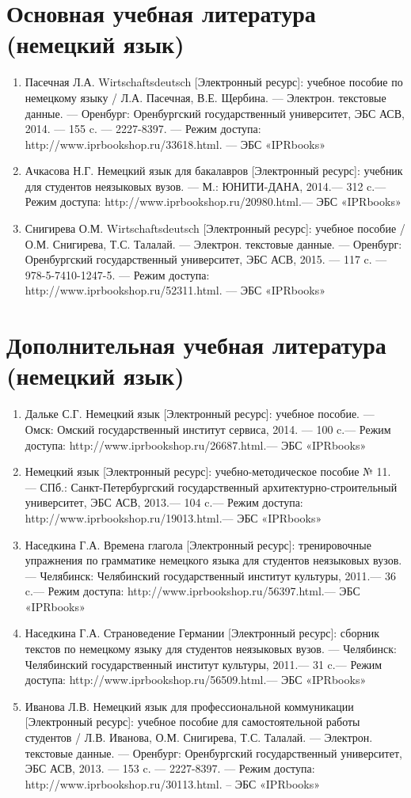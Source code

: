 \section{Основная учебная литература (немецкий язык)}
\begin{enumerate}
\item Пасечная Л.А. Wirtschaftsdeutsch [Электронный ресурс]: учебное пособие по немецкому языку / Л.А. Пасечная, В.Е. Щербина. — Электрон. текстовые данные. — Оренбург: Оренбургский государственный университет, ЭБС АСВ, 2014. — 155 c. — 2227-8397. — Режим доступа: http://www.iprbookshop.ru/33618.html. — ЭБС «IPRbooks»
\item Ачкасова Н.Г. Немецкий язык для бакалавров [Электронный ресурс]: учебник для студентов неязыковых вузов. — М.: ЮНИТИ-ДАНА, 2014.— 312 c.— Режим доступа: http://www.iprbookshop.ru/20980.html.— ЭБС «IPRbooks»
\item Снигирева О.М. Wirtschaftsdeutsch [Электронный ресурс]: учебное пособие / О.М. Снигирева, Т.С. Талалай. — Электрон. текстовые данные. — Оренбург: Оренбургский государственный университет, ЭБС АСВ, 2015. — 117 c. — 978-5-7410-1247-5. — Режим доступа: http://www.iprbookshop.ru/52311.html. — ЭБС «IPRbooks»
\end{enumerate}
\section{Дополнительная учебная литература (немецкий язык)}
\begin{enumerate}
\item Дальке С.Г. Немецкий язык [Электронный ресурс]: учебное пособие. — Омск: Омский государственный институт сервиса, 2014. — 100 c.— Режим доступа: http://www.iprbookshop.ru/26687.html.— ЭБС «IPRbooks»
\item Немецкий язык [Электронный ресурс]: учебно-методическое пособие № 11. — СПб.: Санкт-Петербургский государственный архитектурно-строительный университет, ЭБС АСВ, 2013.— 104 c.— Режим доступа: http://www.iprbookshop.ru/19013.html.— ЭБС «IPRbooks»
\item Наседкина Г.А. Времена глагола [Электронный ресурс]: тренировочные упражнения по грамматике немецкого языка для студентов неязыковых вузов. — Челябинск: Челябинский государственный институт культуры, 2011.— 36 c.— Режим доступа: http://www.iprbookshop.ru/56397.html.— ЭБС «IPRbooks»
\item Наседкина Г.А. Страноведение Германии [Электронный ресурс]: сборник текстов по немецкому языку для студентов неязыковых вузов. — Челябинск: Челябинский государственный институт культуры, 2011.— 31 c.— Режим доступа: http://www.iprbookshop.ru/56509.html.— ЭБС «IPRbooks»
\item Иванова Л.В. Немецкий язык для профессиональной коммуникации [Электронный ресурс]: учебное пособие для самостоятельной работы студентов / Л.В. Иванова, О.М. Снигирева, Т.С. Талалай. — Электрон. текстовые данные. — Оренбург: Оренбургский государственный университет, ЭБС АСВ, 2013. — 153 c. — 2227-8397. — Режим доступа: http://www.iprbookshop.ru/30113.html. – ЭБС «IPRbooks»
\end{enumerate}
